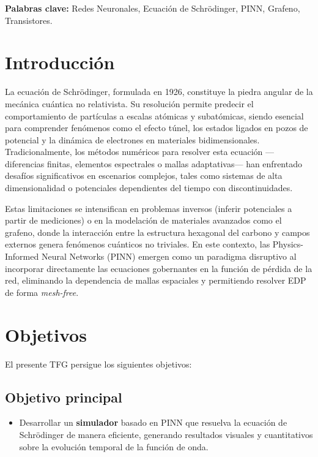 \documentclass[12pt,a4paper]{article}
\begin{document}
	\textbf{Palabras clave:} Redes Neuronales, Ecuación de Schrödinger, PINN, Grafeno, Transistores.
	
	\section{Introducción}
	La ecuación de Schrödinger, formulada en 1926, constituye la piedra angular de la mecánica cuántica no relativista. Su resolución permite predecir el comportamiento de partículas a escalas atómicas y subatómicas, siendo esencial para comprender fenómenos como el efecto túnel, los estados ligados en pozos de potencial y la dinámica de electrones en materiales bidimensionales. Tradicionalmente, los métodos numéricos para resolver esta ecuación —diferencias finitas, elementos espectrales o mallas adaptativas— han enfrentado desafíos significativos en escenarios complejos, tales como sistemas de alta dimensionalidad o potenciales dependientes del tiempo con discontinuidades.
	
	Estas limitaciones se intensifican en problemas inversos (inferir potenciales a partir de mediciones) o en la modelación de materiales avanzados como el grafeno, donde la interacción entre la estructura hexagonal del carbono y campos externos genera fenómenos cuánticos no triviales. En este contexto, las Physics-Informed Neural Networks (PINN) emergen como un paradigma disruptivo al incorporar directamente las ecuaciones gobernantes en la función de pérdida de la red, eliminando la dependencia de mallas espaciales y permitiendo resolver EDP de forma \textit{mesh-free}.
	
	\section{Objetivos}
	El presente TFG persigue los siguientes objetivos:
	
	\subsection{Objetivo principal}
	\begin{itemize}
		\item Desarrollar un \textbf{simulador} basado en PINN que resuelva la ecuación de Schrödinger de manera eficiente, generando resultados visuales y cuantitativos sobre la evolución temporal de la función de onda.
	\end{itemize}
	
\end{document}
